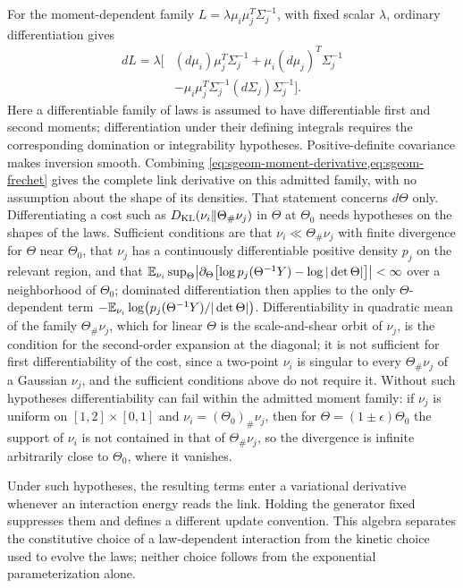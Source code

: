 For the moment-dependent family
$L=\lambda\mu_i\mu_j^T\Sigma_j^{-1}$, with fixed scalar $\lambda$, ordinary differentiation gives
\begin{equation}
\begin{split}
dL=\lambda\bigl[&(d\mu_i)\mu_j^T\Sigma_j^{-1}
+\mu_i(d\mu_j)^T\Sigma_j^{-1}\\
&-\mu_i\mu_j^T\Sigma_j^{-1}(d\Sigma_j)\Sigma_j^{-1}\bigr].
\end{split}
\label{eq:sgeom-moment-derivative}
\end{equation}
Here a differentiable family of laws is assumed to have differentiable first and second moments; differentiation under their defining integrals requires the corresponding domination or integrability hypotheses. Positive-definite covariance makes inversion smooth. Combining \cref{eq:sgeom-moment-derivative,eq:sgeom-frechet} gives the complete link derivative on this admitted family, with no assumption about the shape of its densities. That statement concerns $d\Theta$ only. Differentiating a cost such as $D_{\mathrm{KL}}(\nu_i\Vert\Theta_\#\nu_j)$ in $\Theta$ at $\Theta_0$ needs hypotheses on the shapes of the laws. Sufficient conditions are that $\nu_i\ll\Theta_\#\nu_j$ with finite divergence for $\Theta$ near $\Theta_0$, that $\nu_j$ has a continuously differentiable positive density $p_j$ on the relevant region, and that $\mathbb E_{\nu_i}\sup_{\Theta}\bigl|\partial_\Theta\bigl[\log p_j(\Theta^{-1}Y)-\log|\det\Theta|\bigr]\bigr|<\infty$ over a neighborhood of $\Theta_0$; dominated differentiation then applies to the only $\Theta$-dependent term $-\mathbb E_{\nu_i}\log\bigl(p_j(\Theta^{-1}Y)/|\det\Theta|\bigr)$. Differentiability in quadratic mean of the family $\Theta_\#\nu_j$, which for linear $\Theta$ is the scale-and-shear orbit of $\nu_j$, is the condition for the second-order expansion at the diagonal; it is not sufficient for first differentiability of the cost, since a two-point $\nu_i$ is singular to every $\Theta_\#\nu_j$ of a Gaussian $\nu_j$, and the sufficient conditions above do not require it. Without such hypotheses differentiability can fail within the admitted moment family: if $\nu_j$ is uniform on $[1,2]\times[0,1]$ and $\nu_i=(\Theta_0)_\#\nu_j$, then for $\Theta=(1\pm\epsilon)\Theta_0$ the support of $\nu_i$ is not contained in that of $\Theta_\#\nu_j$, so the divergence is infinite arbitrarily close to $\Theta_0$, where it vanishes.

Under such hypotheses, the resulting terms enter a variational derivative whenever an interaction energy reads the link. Holding the generator fixed suppresses them and defines a different update convention. This algebra separates the constitutive choice of a law-dependent interaction from the kinetic choice used to evolve the laws; neither choice follows from the exponential parameterization alone.
